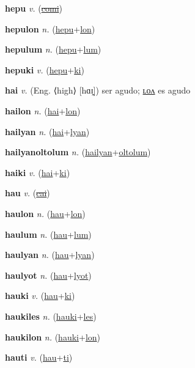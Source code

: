 \textbf{\hypertarget{hepu}{hepu}} \textit{v.} (\hyperlink{comi}{\sout{comi}})


\textbf{\hypertarget{hepulon}{hepulon}} \textit{n.} (\hyperlink{hepu}{hepu}+\allowbreak \hyperlink{lon}{lon})


\textbf{\hypertarget{hepulum}{hepulum}} \textit{n.} (\hyperlink{hepu}{hepu}+\allowbreak \hyperlink{lum}{lum})


\textbf{\hypertarget{hepuki}{hepuki}} \textit{v.} (\hyperlink{hepu}{hepu}+\allowbreak \hyperlink{ki}{ki})


\textbf{\hypertarget{hai}{hai}} \textit{v.} (Eng. ⟨high⟩ [hɑɪ̯])
ser agudo; \hyperlink{hailon}{ʟᴏᴧ} es agudo

\textbf{\hypertarget{hailon}{hailon}} \textit{n.} (\hyperlink{hai}{hai}+\allowbreak \hyperlink{lon}{lon})


\textbf{\hypertarget{hailyan}{hailyan}} \textit{n.} (\hyperlink{hai}{hai}+\allowbreak \hyperlink{lyan}{lyan})


\textbf{\hypertarget{hailyanoltolum}{hailyanoltolum}} \textit{n.} (\hyperlink{hailyan}{hailyan}+\allowbreak \hyperlink{oltolum}{oltolum})


\textbf{\hypertarget{haiki}{haiki}} \textit{v.} (\hyperlink{hai}{hai}+\allowbreak \hyperlink{ki}{ki})


\textbf{\hypertarget{hau}{hau}} \textit{v.} (\hyperlink{cai}{\sout{cai}})


\textbf{\hypertarget{haulon}{haulon}} \textit{n.} (\hyperlink{hau}{hau}+\allowbreak \hyperlink{lon}{lon})


\textbf{\hypertarget{haulum}{haulum}} \textit{n.} (\hyperlink{hau}{hau}+\allowbreak \hyperlink{lum}{lum})


\textbf{\hypertarget{haulyan}{haulyan}} \textit{n.} (\hyperlink{hau}{hau}+\allowbreak \hyperlink{lyan}{lyan})


\textbf{\hypertarget{haulyot}{haulyot}} \textit{n.} (\hyperlink{hau}{hau}+\allowbreak \hyperlink{lyot}{lyot})


\textbf{\hypertarget{hauki}{hauki}} \textit{v.} (\hyperlink{hau}{hau}+\allowbreak \hyperlink{ki}{ki})


\textbf{\hypertarget{haukiles}{haukiles}} \textit{n.} (\hyperlink{hauki}{hauki}+\allowbreak \hyperlink{les}{les})


\textbf{\hypertarget{haukilon}{haukilon}} \textit{n.} (\hyperlink{hauki}{hauki}+\allowbreak \hyperlink{lon}{lon})


\textbf{\hypertarget{hauti}{hauti}} \textit{v.} (\hyperlink{hau}{hau}+\allowbreak \hyperlink{ti}{ti})


